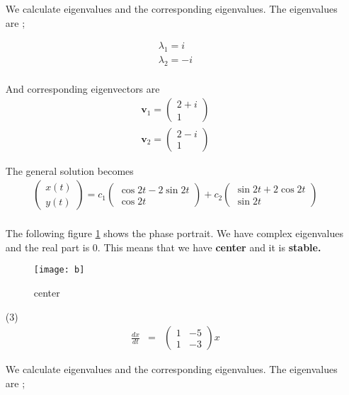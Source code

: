 \documentclass[12pt,a4paper]{article}
\begin{document}
\begin{enumerate}
We calculate eigenvalues and the corresponding eigenvalues.
The eigenvalues are ;

\begin{eqnarray*}
\lambda_1=i\\
\lambda_2=-i\\
\end{eqnarray*}

And corresponding eigenvectors are
\begin{eqnarray*}
\textbf{v}_1=\begin{pmatrix}
2+i\\
1 
\end{pmatrix}\\
\textbf{v}_2=\begin{pmatrix}
2-i\\
 1
\end{pmatrix}
\end{eqnarray*}


The general solution becomes
\begin{eqnarray*}
\begin{pmatrix}
x(t) \\
y(t)
\end{pmatrix}=c_1 \begin{pmatrix}
\cos2t-2 \sin 2t\\
\cos 2t
\end{pmatrix}+c_2 \begin{pmatrix}
\sin 2t+2 \cos 2t\\
 \sin 2t
\end{pmatrix}\\
\end{eqnarray*}

The following figure \ref{fig 2} shows the phase portrait. We have complex eigenvalues and the real part is 0. This means that we have \textbf{center} and it is \textbf{stable.}

\begin{figure}[H]
\texttt{[image: b]}
\centering
\caption{center}
\label{fig 2}
\end{figure}
\item[(3)]
\begin{eqnarray*}
\frac{dx}{dt}&=&\begin{pmatrix}
1 & -5 \\
1& -3
\end{pmatrix}x
\end{eqnarray*}




We calculate eigenvalues and the corresponding eigenvalues.
The eigenvalues are ;


\end{enumerate}
\end{document}
